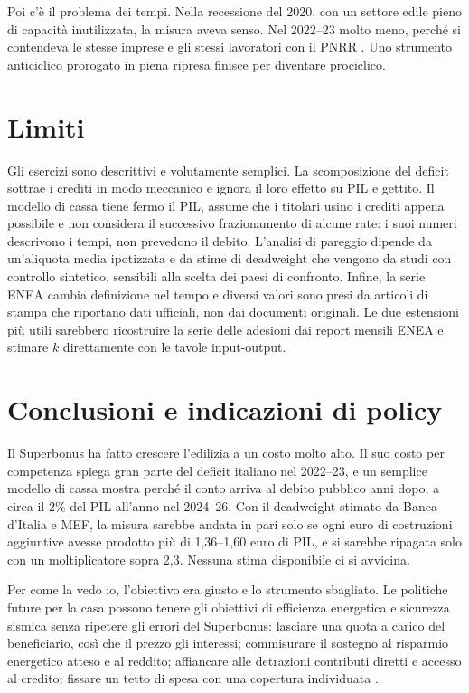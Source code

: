 \documentclass[11pt,a4paper]{article}
\begin{document}
Poi c'è il problema dei tempi. Nella recessione del 2020, con un settore edile pieno di capacità inutilizzata, la misura aveva senso. Nel 2022--23 molto meno, perché si contendeva le stesse imprese e gli stessi lavoratori con il PNRR \citep{codogno2024}. Uno strumento anticiclico prorogato in piena ripresa finisce per diventare prociclico.

\section{Limiti}
Gli esercizi sono descrittivi e volutamente semplici. La scomposizione del deficit sottrae i crediti in modo meccanico e ignora il loro effetto su PIL e gettito. Il modello di cassa tiene fermo il PIL, assume che i titolari usino i crediti appena possibile e non considera il successivo frazionamento di alcune rate: i suoi numeri descrivono i tempi, non prevedono il debito. L'analisi di pareggio dipende da un'aliquota media ipotizzata e da stime di deadweight che vengono da studi con controllo sintetico, sensibili alla scelta dei paesi di confronto. Infine, la serie ENEA cambia definizione nel tempo e diversi valori sono presi da articoli di stampa che riportano dati ufficiali, non dai documenti originali. Le due estensioni più utili sarebbero ricostruire la serie delle adesioni dai report mensili ENEA e stimare $k$ direttamente con le tavole input-output.

\section{Conclusioni e indicazioni di policy}
Il Superbonus ha fatto crescere l'edilizia a un costo molto alto. Il suo costo per competenza spiega gran parte del deficit italiano nel 2022--23, e un semplice modello di cassa mostra perché il conto arriva al debito pubblico anni dopo, a circa il 2\% del PIL all'anno nel 2024--26. Con il deadweight stimato da Banca d'Italia e MEF, la misura sarebbe andata in pari solo se ogni euro di costruzioni aggiuntive avesse prodotto più di 1,36--1,60 euro di PIL, e si sarebbe ripagata solo con un moltiplicatore sopra 2,3. Nessuna stima disponibile ci si avvicina.

Per come la vedo io, l'obiettivo era giusto e lo strumento sbagliato. Le politiche future per la casa possono tenere gli obiettivi di efficienza energetica e sicurezza sismica senza ripetere gli errori del Superbonus: lasciare una quota a carico del beneficiario, così che il prezzo gli interessi; commisurare il sostegno al risparmio energetico atteso e al reddito; affiancare alle detrazioni contributi diretti e accesso al credito; fissare un tetto di spesa con una copertura individuata \citep{deblasio2024}.
\end{document}
